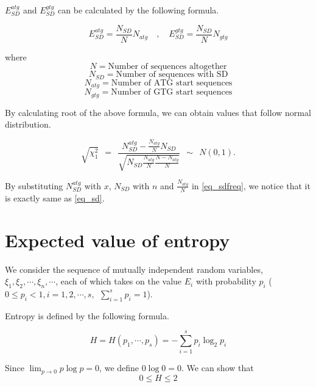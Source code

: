 \vspace{1em}

\noindent
\(E^{atg}_{SD}\) and \(E^{gtg}_{SD}\) can be calculated by the following
formula.
 
\vspace{1em}

\[ E^{atg}_{SD} = \frac{N_{SD}}{N}N_{atg} \quad ,\quad
   E^{gtg}_{SD} = \frac{N_{SD}}{N}N_{gtg} \]

\vspace{1em}
\noindent
where 
\[ N = \mbox{Number of sequences altogether}\]
\[ N_{SD} = \mbox{Number of sequences with SD}\]
\[ N_{atg} = \mbox{Number of ATG start sequences}\]
\[ N_{gtg} = \mbox{Number of GTG start sequences}\]

\vspace{1em}

\noindent
By calculating root of the above formula, we can obtain values that
follow normal distribution. 

\begin{equation}
\sqrt{\chi^{2}_{1}}\:\: = \:\: \frac{ N^{atg}_{SD} - \frac{N_{atg}}{N}N_{SD}}{ \sqrt{N_{SD}
 \frac{N_{atg}}{N}\frac{N - N_{atg}}{N}}}\:\:\sim\:\:N(0, 1).
\label{eq_sdfreq}
\end{equation}

\noindent
By substituting \(N_{SD}^{atg}\) with \(x\), \(N_{SD}\) with \(n\) and 
\(\frac{N_{atg}}{N}\) in \ref{eq_sdfreq}, we notice that it is exactly same as
\ref{eq_sd}.



\section{Expected value of entropy}
\label{ic_detail}

We consider the sequence of mutually independent random variables, 
\(\xi_{1}, \xi_{2}, \cdots , \xi_{n}, \cdots\), each of which takes on the value \(E_{i}\) with probability \(p_{i}\) (\(0 \leq p_{i} < 1, i = 1,2,\cdots, s,
  \:\: \sum_{i=1}^{s}p_{i} = 1 \)).

\noindent
Entropy is defined by the following formula.

\begin{equation}
H = H(p_{1}, \cdots , p_{s}) = -\sum_{i=1}^{s}p_{i}\log_{2}p_{i} 
\label{entropy}
\end{equation}

\noindent
Since \(\lim_{p \to 0}p\log p = 0\), we define \(0\log 0 = 0\).
We can show that 
\[
0 \leq H \leq 2
\]

